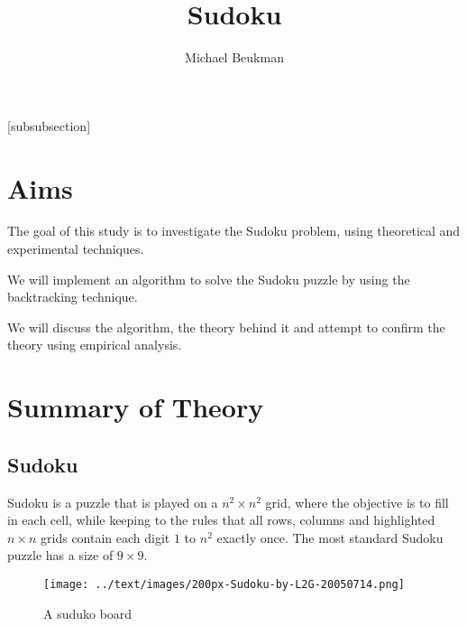 \documentclass[16pt]{article}
\title{Sudoku}
\author{Michael Beukman}
\begin{document}
\maketitle
\makeatletter
\newcommand*{\centerfloat}{%
  \parindent \z@
  \leftskip \z@ \@plus 1fil \@minus \textwidth
  \rightskip\leftskip
  \parfillskip \z@skip}
\makeatother

\renewcommand*{\thesubfigure}{%
\alphalph{\value{subfigure}}%
}%
\graphicspath{ {../dataAnalysis/} }
\DeclarePairedDelimiter\ceil{\lceil}{\rceil}
\DeclarePairedDelimiter\floor{\lfloor}{\rfloor}

\makeatletter
\renewcommand\paragraph{\@startsection{paragraph}{4}{\z@}%
            {-2.5ex\@plus -1ex \@minus -.25ex}%
            {1.25ex \@plus .25ex}%
            {\normalfont\normalsize\bfseries}}
\makeatother
\setcounter{secnumdepth}{4} %


[subsubsection]
\setcounter{tocdepth}{3}
\tableofcontents

\section{Aims}
The goal of this study is to investigate the Sudoku problem, using theoretical and experimental techniques.
  
We will implement an algorithm to solve the Sudoku puzzle by using the backtracking technique.

We will discuss the algorithm, the theory behind it and attempt to confirm the theory using empirical analysis.
\section{Summary of Theory}
\subsection{Sudoku}
Sudoku is a puzzle that is played on a $n^2 \times n^2$ grid, where the objective is to fill in each cell, while keeping to the rules that all rows, columns and highlighted $n \times n$ grids contain each digit $1$ to $n^2$ exactly once.
The most standard Sudoku puzzle has a size of $9 \times 9$.
\cite{sudoku_book}
\begin{figure}[H]
    \centering
    \texttt{[image: ../text/images/200px-Sudoku-by-L2G-20050714.png]}
    \caption{A suduko board \cite{wikimedia_sudoku_image}}
\end{figure}
\end{document}
